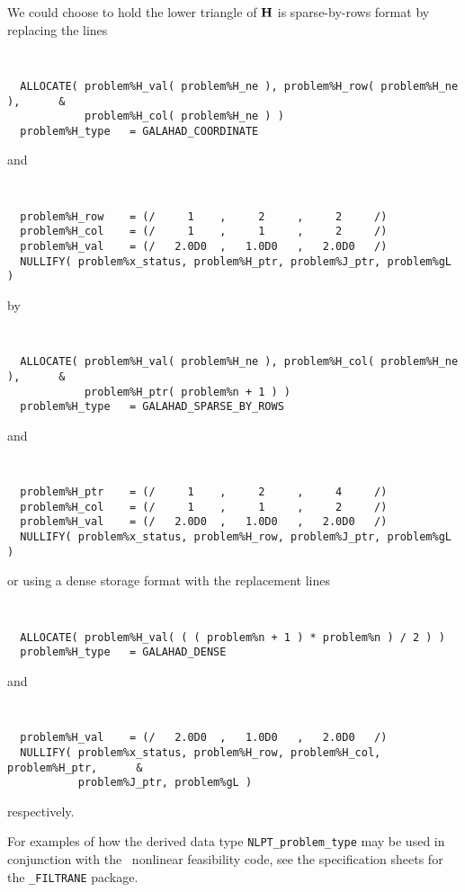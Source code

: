 \documentclass{galahad}
\newcommand{\packagename}{NLPT}
\begin{document}
\noindent
We could choose to hold the lower triangle of ${\mathbf{H}}$ is sparse-by-rows format
by replacing the lines
{\tt \small
\begin{verbatim}
  ALLOCATE( problem%H_val( problem%H_ne ), problem%H_row( problem%H_ne ),      &
            problem%H_col( problem%H_ne ) )
  problem%H_type   = GALAHAD_COORDINATE
\end{verbatim}
}
\noindent
and
{\tt \small
\begin{verbatim}
  problem%H_row    = (/     1    ,     2     ,     2     /)
  problem%H_col    = (/     1    ,     1     ,     2     /)
  problem%H_val    = (/   2.0D0  ,   1.0D0   ,   2.0D0   /)
  NULLIFY( problem%x_status, problem%H_ptr, problem%J_ptr, problem%gL )
\end{verbatim}
}
\noindent
by
{\tt \small
\begin{verbatim}
  ALLOCATE( problem%H_val( problem%H_ne ), problem%H_col( problem%H_ne ),      &
            problem%H_ptr( problem%n + 1 ) )
  problem%H_type   = GALAHAD_SPARSE_BY_ROWS
\end{verbatim}
}
\noindent
and
{\tt \small
\begin{verbatim}
  problem%H_ptr    = (/     1    ,     2     ,     4     /)
  problem%H_col    = (/     1    ,     1     ,     2     /)
  problem%H_val    = (/   2.0D0  ,   1.0D0   ,   2.0D0   /)
  NULLIFY( problem%x_status, problem%H_row, problem%J_ptr, problem%gL )
\end{verbatim}
}
\noindent
or using a dense storage format with the replacement lines
{\tt \small
\begin{verbatim}
  ALLOCATE( problem%H_val( ( ( problem%n + 1 ) * problem%n ) / 2 ) )
  problem%H_type   = GALAHAD_DENSE
\end{verbatim}
}
\noindent
and
{\tt \small
\begin{verbatim}
  problem%H_val    = (/   2.0D0  ,   1.0D0   ,   2.0D0   /)
  NULLIFY( problem%x_status, problem%H_row, problem%H_col, problem%H_ptr,      &
           problem%J_ptr, problem%gL )
\end{verbatim}
}
\noindent
respectively.

For examples of how the derived data type
{\tt \packagename\_problem\_type} may be used in conjunction with the
\galahad\ nonlinear feasibility code, see the specification sheets
for the {\tt \libraryname\_FILTRANE} package.
\end{document}
